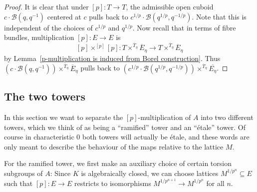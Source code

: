\documentclass[10pt,oneside]{amsart}
\theoremstyle{definition}
\theoremstyle{remark}
\begin{document}
	\begin{proof}
		It is clear that under $[p]:T\rightarrow T$, the admissible open cuboid $c\cdot \mathcal B(q,q^{-1})$ centered at $c$ pulls back to $c^{1/p}\cdot \mathcal B(q^{1/p},q^{-1/p})$. Note that this is independent of the choices of $c^{1/p}$ and $q^{1/p}$. Now recall that in terms of fibre bundles, multiplication $[p]:E\rightarrow E$ is
		\[[p]\times^{[p]}[p]: T\times^{\overline{T}_\eta}\overline{E}_\eta\rightarrow T\times^{\overline{T}_\eta}\overline{E}_\eta \]
		by Lemma~\ref{p-multiplication is induced from Borel construction}. Thus $(c\cdot \mathcal B(q,q^{-1}))\times^{\overline{T}_\eta}\overline{E}_\eta$ pulls back to $(c^{1/p}\cdot \mathcal B(q^{1/p},q^{-1/p}))\times^{\overline{T}_\eta}\overline{E_\eta}$.
	\end{proof}

	\subsection{The two towers}
	In this section we want to separate the $[p]$-multiplication of $A$ into two different towers, which we think of as being a ``ramified'' tower and an ``\'etale'' tower. Of course in characteristic $0$ both towers will actually be \'etale, and these words are only meant to describe the behaviour of the maps relative to the lattice $M$.
	
	For the ramified tower, we first make an auxiliary choice of certain torsion subgroups of $A$: Since $K$ is algebraically closed, we can choose lattices $M^{1/p^n}\subseteq E$ such that $[p]:E\rightarrow E$ restricts to isomorphisms $M^{1/p^{n+1}}\rightarrow M^{1/p^n}$ for all $n$.
	
\end{document}
